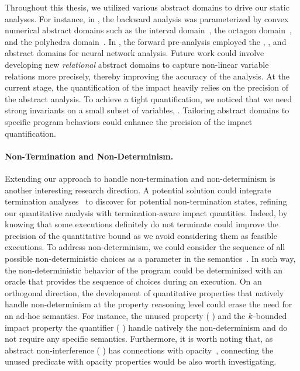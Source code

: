 Throughout this thesis, we utilized various abstract domains to drive our static analyses.
For instance, in , the backward analysis was parameterized by convex numerical abstract domains such as the interval domain~, the octagon domain~, and the polyhedra domain~\cite{Cousot1978}.
In , the forward pre-analysis employed the \symbolic{} \cite{Wang2018b}, \deeppoly{} \cite{Singh2019}, and \neurify{} \cite{Wang2018a} abstract domains for neural network analysis.
Future work could involve developing new \emph{relational} abstract domains to capture non-linear variable relations more precisely, thereby improving the accuracy of the analysis.
At the current stage, the quantification of the impact heavily relies on the precision of the abstract analysis.
To achieve a tight quantification, we noticed that we need strong invariants on a small subset of variables, \cf{} .
Tailoring abstract domains to specific program behaviors could enhance the precision of the impact quantification.

\paragraph{Non-Termination and Non-Determinism.}
Extending our approach to handle non-termination and non-determinism is another interesting research direction.
A potential solution could integrate termination analyses~ to discover for potential non-termination states, refining our quantitative analysis with termination-aware impact quantities.
Indeed, by knowing that some executions definitely do not terminate could improve the precision of the quantitative bound as we avoid considering them as feasible executions.
To address non-determinism, we could consider the sequence of all possible non-deterministic choices as a parameter in the semantics~.
In such way, the non-deterministic behavior of the program could be determinized with an oracle that provides the sequence of choices during an execution.
On an orthogonal direction, the development of quantitative properties that natively handle non-determinism at the property reasoning level could erase the need for an ad-hoc semantics.
For instance, the unused property (\cf{} ) and the $k$-bounded impact property \wrt{} the \qusedname{}
quantifier (\cf{} ) handle natively the non-determinism and do not require any specific semantics.
Furthermore, it is worth noting that, as abstract non-interference (\cf{} ) has connections with opacity~, connecting the unused predicate with opacity properties would be also worth investigating.

